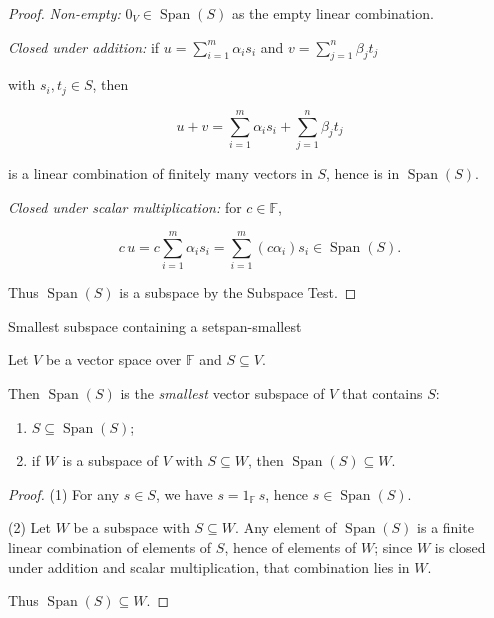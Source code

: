 \begin{proof}

\emph{Non-empty:} $0_V\in \operatorname{Span}(S)$ as the empty linear combination.

\emph{Closed under addition:} if $u=\sum_{i=1}^m \alpha_i s_i$ and $v=\sum_{j=1}^n \beta_j t_j$

with $s_i,t_j\in S$, then

\[
u+v=\sum_{i=1}^m \alpha_i s_i + \sum_{j=1}^n \beta_j t_j
\]

is a linear combination of finitely many vectors in $S$, hence is in $\operatorname{Span}(S)$.

\emph{Closed under scalar multiplication:} for $c\in\mathbb{F}$,

\[
c\,u=c\sum_{i=1}^m \alpha_i s_i = \sum_{i=1}^m (c\alpha_i)s_i \in \operatorname{Span}(S).
\]

Thus $\operatorname{Span}(S)$ is a subspace by the Subspace Test.

\end{proof}

\begin{theorem}{Smallest subspace containing a set}{span-smallest}

Let $V$ be a vector space over $\mathbb{F}$ and $S\subseteq V$.

Then $\operatorname{Span}(S)$ is the \emph{smallest} vector subspace of $V$ that contains $S$:

\begin{enumerate}[label=(\arabic*), leftmargin=*]

\item $S\subseteq \operatorname{Span}(S)$;

\item if $W$ is a subspace of $V$ with $S\subseteq W$, then $\operatorname{Span}(S)\subseteq W$.

\end{enumerate}

\end{theorem}

\begin{proof}

(1) For any $s\in S$, we have $s=1_{\mathbb{F}}\,s$, hence $s\in \operatorname{Span}(S)$.

(2) Let $W$ be a subspace with $S\subseteq W$. Any element of $\operatorname{Span}(S)$ is a finite linear combination of elements of $S$, hence of elements of $W$; since $W$ is closed under addition and scalar multiplication, that combination lies in $W$.

Thus $\operatorname{Span}(S)\subseteq W$.

\end{proof}

